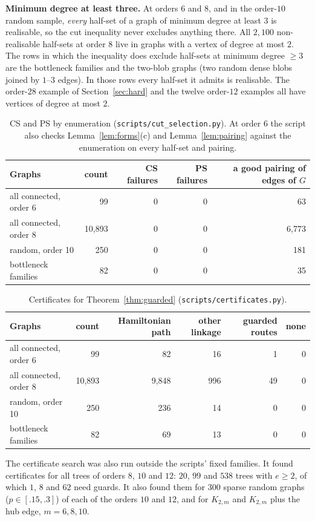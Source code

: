 \documentclass[11pt]{amsart}
\theoremstyle{definition}
\begin{document}
\textbf{Minimum degree at least three.} At orders $6$ and $8$, and in the order-$10$ random sample,
\emph{every} half-set of a graph of minimum degree at least $3$ is realisable, so the cut inequality
never excludes anything there. All $2{,}100$ non-realisable half-sets at order $8$ live in graphs with
a vertex of degree at most $2$. The rows in which the inequality does exclude half-sets at minimum
degree $\ge3$ are the bottleneck families and the two-blob graphs (two random dense blobs joined by
$1$--$3$ edges). In those rows every half-set it admits is realisable. The order-$28$ example of
Section~\ref{sec:hard} and the twelve order-$12$ examples all have vertices of degree at most $2$.

\begin{table}[h]
\caption{CS and PS by enumeration (\texttt{scripts/cut\_selection.py}). At order $6$ the script also
checks Lemma~\ref{lem:forms}(c) and Lemma~\ref{lem:pairing} against the enumeration on every half-set
and pairing.}\label{tab:cs}
\begin{tabular}{lrrrr}
\toprule
Graphs & count & CS failures & PS failures & a good pairing of edges of $G$\\
\midrule
all connected, order 6 & 99 & 0 & 0 & 63\\
all connected, order 8 & 10{,}893 & 0 & 0 & 6{,}773\\
random, order 10 & 250 & 0 & 0 & 181\\
bottleneck families & 82 & 0 & 0 & 35\\
\bottomrule
\end{tabular}
\end{table}

\begin{table}[h]
\caption{Certificates for Theorem~\ref{thm:guarded} (\texttt{scripts/certificates.py}).}\label{tab:cert}
\begin{tabular}{lrrrrr}
\toprule
Graphs & count & Hamiltonian path & other linkage & guarded routes & none\\
\midrule
all connected, order 6 & 99 & 82 & 16 & 1 & 0\\
all connected, order 8 & 10{,}893 & 9{,}848 & 996 & 49 & 0\\
random, order 10 & 250 & 236 & 14 & 0 & 0\\
bottleneck families & 82 & 69 & 13 & 0 & 0\\
\bottomrule
\end{tabular}
\end{table}

The certificate search was also run outside the scripts' fixed families. It found certificates for
all trees of orders $8$, $10$ and $12$: $20$, $99$ and $538$ trees with $e\ge 2$, of which $1$, $8$ and
$62$ need guards. It also found them for $300$ sparse random graphs ($p\in[.15,.3]$) of each of the
orders $10$ and $12$, and for $K_{2,m}$ and $K_{2,m}$ plus the hub edge, $m=6,8,10$.
\end{document}
